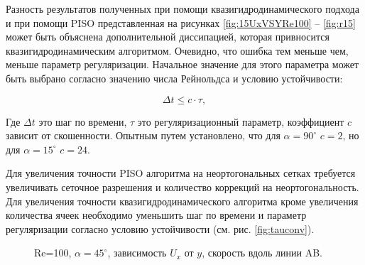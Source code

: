 Разность результатов полученных при помощи квазигидродинамического подхода и при помощи PISO представленная на рисунках \ref{fig:15UxVSYRe100} -- \ref{fig:r15} может быть объяснена дополнительной диссипацией, которая привносится квазигидродинамическим алгоритмом. Очевидно, что ошибка тем меньше чем, меньше параметр регуляризации. Начальное значение для этого параметра может быть выбрано согласно значению числа Рейнольдса и условию устойчивости:

\begin{equation}
    \Delta t \leq c \cdot \tau,
\end{equation}

Где $\Delta t$ это шаг по времени, $\tau$ это регуляризационный параметр, коэффициент $c$ зависит от скошенности. Опытным путем установлено, что для $\alpha = 90^{\circ}$ $c=2$, но для $\alpha = 15^{\circ}$ $c=24$.

Для увеличения точности PISO алгоритма на неортогональных сетках требуется увеличивать сеточное разрешения и количество коррекций на неортогональность. Для увеличения точности квазигидродинамического алгоритма кроме увеличения количества ячеек необходимо уменьшить шаг по времени и параметр регуляризации согласно условию устойчивости (см. рис. \ref{fig:tauconv}). 

\begin{figure}[!ht]
    \centering
        \caption{Re=100, $\alpha = 45^\circ$, зависимость $U_x$ от $y$, скорость вдоль линии AB.}
        \label{fig:Re10045UxVSy}
\end{figure}

